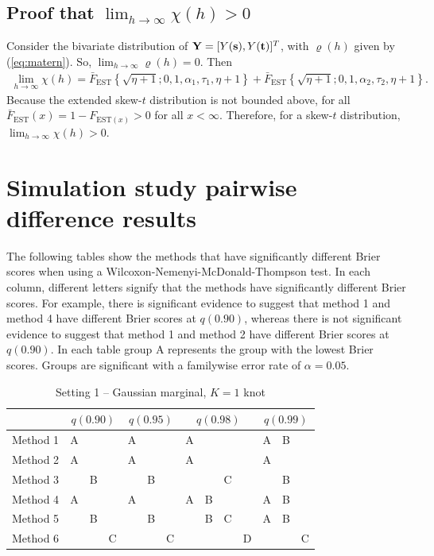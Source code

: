 \documentclass[useAMS,usenatbib,referee]{biomweb}
\begin{document}
\subsection*{Proof that $\lim_{h \rightarrow \infty} \chi(h) > 0$}
Consider the bivariate distribution of $\mbox{\bf Y} = [Y(\mbox{\bf s}), Y(\mbox{\bf t})]^T$, with $\varrho(h)$ given by (\ref{eq:matern}).
So, $\lim_{h \rightarrow \infty} \varrho(h) = 0$.
Then
\begin{align}
  \lim_{h \rightarrow \infty} \chi(h) = \bar{F}_{\text{EST}}\left\{ \sqrt{\eta + 1}; 0, 1, \alpha_1, \tau_1, \eta + 1 \right\} + \bar{F}_{\text{EST}}\left\{ \sqrt{\eta + 1}; 0, 1, \alpha_2, \tau_2, \eta + 1 \right\}.
\end{align}
Because the extended skew-$t$ distribution is not bounded above, for all $\bar{F}_{\text{EST}}(x) = 1 - F_{\text{EST} (x)} > 0$ for all $x < \infty$.
Therefore, for a skew-$t$ distribution, $\lim_{h \rightarrow \infty} \chi(h) > 0$.

\section{Simulation study pairwise difference results} \label{a:pdiffs}
The following tables show the methods that have significantly different Brier scores when using a Wilcoxon-Nemenyi-McDonald-Thompson test.
In each column, different letters signify that the methods have significantly different Brier scores.
For example, there is significant evidence to suggest that method 1 and method 4 have different Brier scores at $q(0.90)$, whereas there is not significant evidence to suggest that method 1 and method 2 have different Brier scores at $q(0.90)$.
In each table group A represents the group with the lowest Brier scores.
Groups are significant with a familywise error rate of $\alpha = 0.05$.

\begin{table}[htbp]
  \centering
  \caption{Setting 1 -- Gaussian marginal, $K = 1$ knot}
  \label{tbl:gaussim}
  \begin{tabular}{|l|ccc|ccc|cccc|ccc|}
    \cline{2-14}
    \multicolumn{1}{c}{} & \multicolumn{3}{|c}{$q(0.90)$} & \multicolumn{3}{|c}{$q(0.95)$} & \multicolumn{4}{|c}{$q(0.98)$} & \multicolumn{3}{|c|}{$q(0.99)$} \\
    \hline
    Method 1 & A &   &   & A &   &   & A &   &   &   & A & B &   \\
    \hline
    Method 2 & A &   &   & A &   &   & A &   &   &   & A &   &   \\
    \hline
    Method 3 &   & B &   &   & B &   &   &   & C &   &   & B &   \\
    \hline
    Method 4 & A &   &   & A &   &   & A & B &   &   & A & B &   \\
    \hline
    Method 5 &   & B &   &   & B &   &   & B & C &   & A & B &   \\
    \hline
    Method 6 &   &   & C &   &   & C &   &   &   & D &   &   & C \\
    \hline
  \end{tabular}
\end{table}
\end{document}
